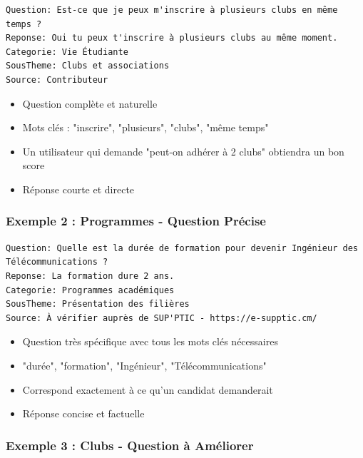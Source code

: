 \documentclass[11pt,a4paper]{article}
\begin{document}
\begin{lstlisting}[caption=Extrait réel - Vie Étudiante]
Question: Est-ce que je peux m'inscrire à plusieurs clubs en même temps ?
Reponse: Oui tu peux t'inscrire à plusieurs clubs au même moment.
Categorie: Vie Étudiante
SousTheme: Clubs et associations
Source: Contributeur
\end{lstlisting}

\begin{astuce}
\begin{itemize}
    \item Question complète et naturelle
    \item Mots clés : "inscrire", "plusieurs", "clubs", "même temps"
    \item Un utilisateur qui demande "peut-on adhérer à 2 clubs" obtiendra un bon score
    \item Réponse courte et directe
\end{itemize}
\end{astuce}

\subsubsection{Exemple 2 : Programmes - Question Précise}

\begin{lstlisting}[caption=Extrait réel - Programmes académiques]
Question: Quelle est la durée de formation pour devenir Ingénieur des Télécommunications ?
Reponse: La formation dure 2 ans.
Categorie: Programmes académiques
SousTheme: Présentation des filières
Source: À vérifier auprès de SUP'PTIC - https://e-supptic.cm/
\end{lstlisting}

\begin{astuce}
\begin{itemize}
    \item Question très spécifique avec tous les mots clés nécessaires
    \item "durée", "formation", "Ingénieur", "Télécommunications"
    \item Correspond exactement à ce qu'un candidat demanderait
    \item Réponse concise et factuelle
\end{itemize}
\end{astuce}

\subsubsection{Exemple 3 : Clubs - Question à Améliorer}
\end{document}

